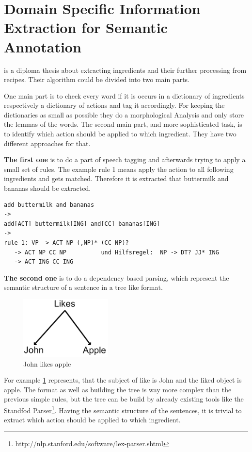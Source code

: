 \documentclass[12pt, twoside]{report}
\begin{document}
 
\section{Domain Specific Information Extraction for Semantic Annotation}
\parencite{GrammaBased} is a diploma thesis about extracting ingredients and their further processing from recipes. Their algorithm could be divided into two main parts.

One main part is to check every word if it is occurs in a dictionary of ingredients respectively a dictionary of actions and tag it accordingly. For keeping the dictionaries as small as possible they do a morphological Analysis and only store the lemmas of the words. The second main part, and more sophisticated task, is to identify which action should be applied to which ingredient. They have two different approaches for that.

\textbf{The first one} is to do a part of speech tagging and afterwards trying to apply a small set of rules. The example rule 1 means apply the action to all following ingredients and gets matched. Therefore it is extracted that buttermilk and bananas should be extracted.

\begin{lstlisting}[frame=single, basicstyle=\footnotesize\ttfamily,caption={Rule based example}, label=lst:ruleBased]
add buttermilk and bananas
->
add[ACT] buttermilk[ING] and[CC] bananas[ING]
->
rule 1: VP -> ACT NP (,NP)* (CC NP)?
   -> ACT NP CC NP			und Hilfsregel:  NP -> DT? JJ* ING
   -> ACT ING CC ING

\end{lstlisting}

\textbf{The second one} is to do a dependency based parsing, which represent the semantic structure of a sentence in a tree like format.

\begin{figure}[h]
	\centering
	\includegraphics[]{Images/JohnLikesApple}
	\caption{John likes apple \parencite{GrammaBased}}
	\label{fig:johnLikesApple}
\end{figure}

For example \cref{fig:johnLikesApple} represents, that the subject of like is John and the liked object is apple.
The format as well as building the tree is way more complex than the previous simple rules, but the tree can be build by already existing tools like the Standfod Parser\footnote{http://nlp.stanford.edu/software/lex-parser.shtml}. Having the semantic structure of the sentences, it is trivial to extract which action should be applied to which ingredient.
\end{document}
